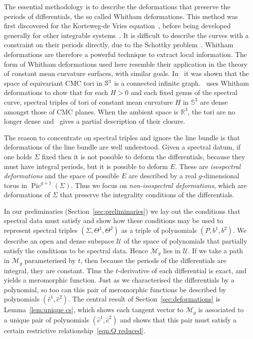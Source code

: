 \documentclass{article}
\begin{document}
The essential methodology is to describe the deformations that preserve the periods of differentials, the so called Whitham deformations. This method was first discovered for the Korteweg-de Vries equation~\cite{Flaschka1980,Lax1983}, before being developed generally for other integrable systems~\cite{Krichever1995,Gorsky1995}. 
It is difficult to describe the curves with a constraint on their periods directly, due to the Schottky problem~\cite{Grushevsky2012,Shiota1986}. Whitham deformations are therefore a powerful technique to extract local information.
The form of Whitham deformations used here resemble their application in the theory of constant mean curvature surfaces, with similar goals. In~\cite{Kilian2015a} it was shown that the space of equivariant CMC tori in $\S^3$ is a connected infinite graph.~\cite{Carberry2016a} 
uses Whitham deformations to show that for each $H > 0$ and each fixed genus of the spectral curve, spectral triples of tori of constant mean curvature $H$ in $\mathbb{S}^3 $ are dense amongst those of CMC planes. When the ambient space is $\mathbb{R}^3$, the tori are no longer dense and~\cite{Carberry2016} gives a partial description of their closure.

The reason to concentrate on spectral triples and ignore the line bundle is that deformations of the line bundle are well understood. Given a spectral datum, if one holds $\Sigma$ fixed then it is not possible to deform the differentials, because they must have integral periods, but it is possible to deform $E$. These are \emph{isospectral deformations} and the space of possible $E$ are described by a real $g$-dimensional torus in $\operatorname{Pic}^{g+1}(\Sigma)$. Thus we focus on \emph{non-isospectral deformations}, which are deformations of $\Sigma$ that preserve the integrality conditions of the differentials.

In our preliminaries (Section~\ref{sec:preliminaries}) we lay out the conditions that spectral data must satisfy and show how these conditions may be used to represent spectral triples $(\Sigma,\Theta^1,\Theta^2)$ as a triple of polynomials $(P,b^1,b^2)$. We describe an open and dense subspace $\mathcal{U}$ of the space of polynomials that partially satisfy the conditions to be spectral data. Hence $\mathcal{M}_g$ lies in $\mathcal{U}$. 
If we take a path in $\mathcal{M}_g$ parameterised by $t$, then because the periods of the differentials are integral, they are constant. Thus the $t$-derivative of each differential is exact, and yields a meromorphic function. Just as we characterised the differentials by a polynomial, so too can this pair of meromorphic functions be described by polynomials $(\hat{c}^1,\hat{c}^2)$.
The central result of Section~\ref{sec:deformations} is Lemma~\ref{lem:unique cs}, which shows each tangent vector to $\mathcal{M}_g$ is associated to a unique pair of polynomials $(\hat{c}^1,\hat{c}^2)$ and shows that this pair must satisfy a certain restrictive relationship~\eqref{eqn:Q reduced}.
\end{document}
